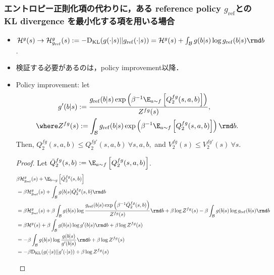 \documentclass[a4paper,10pt,dvipdfmx]{jsarticle}
\begin{document}
\subsubsection{エントロピー正則化項の代わりに，ある reference policy $g_{\mathrm{ref}}$とのKL divergence を最小化する項を用いる場合}\label{sec:max_ent_reference_policy}

\begin{itemize}
    \item $\mathcal{H}^{g}(s)\to \mathcal{H}_{g_{\mathrm{ref}}}^{g}(s):=-\mathrm{D_{KL}}(g(\cdot|s)||g_{\mathrm{ref}}(\cdot|s))=\mathcal{H}^g(s)+\int_{\mathcal{B}}g(b|s)\log g_{\mathrm{ref}}(b|s)\rmd b$.
    \item 検証する必要があるのは，policy improvement以降．
    \item Policy improvement: let
    \begin{align}
        &g'(b|s):=\dfrac{g_{\mathrm{ref}}(b|s)\exp\left(\beta^{-1}\E_{a\sim f}\left[Q_2^{fg}(s,a,b)\right]\right)}{Z^{fg}(s)},\\
        \where &Z^{fg}(s):=\int_{\mathcal{B}}g_{\mathrm{ref}}(b|s)\exp\left(\beta^{-1}\E_{a\sim f}\left[Q_2^{fg}(s,a,b)\right]\right)\rmd b.
    \end{align}
    Then, $Q_2^{fg}(s,a,b)\le Q_2^{fg'}(s,a,b)~\forall s,a,b,$ and $V_2^{fg}(s)\le V_2^{fg'}(s)~\forall s.$
    \begin{proof}
        Let $\bar{Q}_2^{fg}(s,b):=\E_{a\sim f}\left[Q_2^{fg}(s,a,b)\right]$.
        \begin{align}
            &\beta\mathcal{H}_{g_{\mathrm{ref}}}^g(s)+\E_{b\sim g}\left[\bar{Q}_2^{fg}(s,b)\right]\\
            &=\beta\mathcal{H}_{g_{\mathrm{ref}}}^g(s)+\int_{\mathcal{B}}g(b|s)\bar{Q}_2^{fg}(s,b)\rmd b\\
            &=\beta\mathcal{H}_{g_{\mathrm{ref}}}^g(s)+\beta\int_{\mathcal{B}}g(b|s)\log\dfrac{g_{\mathrm{ref}}(b|s)\exp\left(\beta^{-1}\bar{Q}_2^{fg}(s,b)\right)}{Z^{fg}(s)}\rmd b +\beta\log Z^{fg}(s)-\beta\int_{\mathcal{B}}g(b|s)\log g_{\mathrm{ref}}(b|s)\rmd b\\
            &=\beta\mathcal{H}^g(s)+\beta\int_{\mathcal{B}}g(b|s)\log g'(b|s)\rmd b +\beta\log Z^{fg}(s)\\
            &=-\beta\int_{\mathcal{B}}g(b|s)\log\dfrac{g(b|s)}{g'(b|s)}\rmd b+\beta\log Z^{fg}(s)\\
            &=-\beta \mathrm{D_{KL}}(g(\cdot|s)||g'(\cdot|s))+\beta\log Z^{fg}(s)
        \end{align}
        \begin{align}

\end{align}
\end{proof}
\end{itemize}
\end{document}
